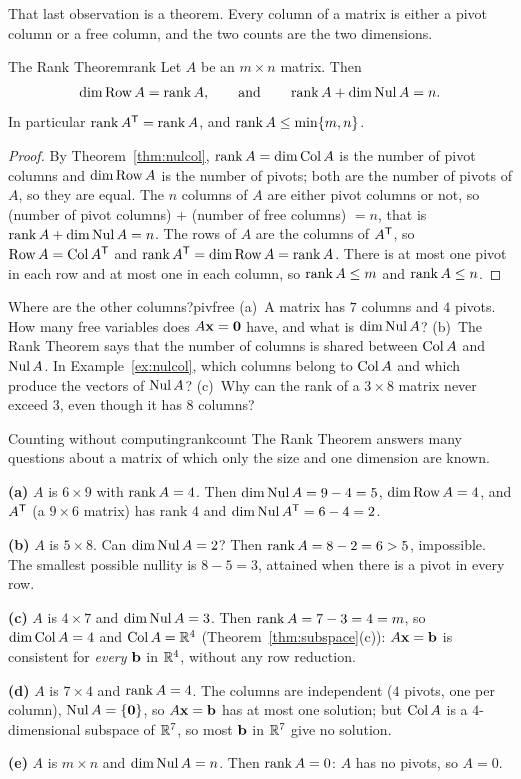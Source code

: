 \documentclass[11pt]{article}
\begin{document}
That last observation is a theorem. Every column of a matrix is either a pivot column or a free column, and the two counts are the two dimensions.

\begin{thm}{The Rank Theorem}{rank}
Let $A$ be an $m\times n$ matrix. Then
\[
\dim\operatorname{Row} A=\operatorname{rank} A,\qquad\text{and}\qquad \operatorname{rank} A+\dim\operatorname{Nul} A=n.
\]
In particular $\operatorname{rank} A^{\mathsf T}=\operatorname{rank} A$, and $\operatorname{rank} A\le\min\{m,n\}$.
\end{thm}

\begin{proof}
By Theorem~\ref{thm:nulcol}, $\operatorname{rank} A=\dim\operatorname{Col} A$ is the number of pivot columns and $\dim\operatorname{Row} A$ is the number of pivots; both are the number of pivots of $A$, so they are equal. The $n$ columns of $A$ are either pivot columns or not, so (number of pivot columns) $+$ (number of free columns) $=n$, that is $\operatorname{rank} A+\dim\operatorname{Nul} A=n$. The rows of $A$ are the columns of $A^{\mathsf T}$, so $\operatorname{Row} A=\operatorname{Col} A^{\mathsf T}$ and $\operatorname{rank} A^{\mathsf T}=\dim\operatorname{Row} A=\operatorname{rank} A$. There is at most one pivot in each row and at most one in each column, so $\operatorname{rank} A\le m$ and $\operatorname{rank} A\le n$.
\end{proof}

\begin{think}{Where are the other columns?}{pivfree}
(a)~A matrix has $7$ columns and $4$ pivots. How many free variables does $A\mathbf{x}=\mathbf{0}$ have, and what is $\dim\operatorname{Nul} A$? (b)~The Rank Theorem says that the number of columns is shared between $\operatorname{Col} A$ and $\operatorname{Nul} A$. In Example~\ref{ex:nulcol}, which columns belong to $\operatorname{Col} A$ and which produce the vectors of $\operatorname{Nul} A$? (c)~Why can the rank of a $3\times 8$ matrix never exceed $3$, even though it has $8$ columns?
\end{think}

\begin{exmp}{Counting without computing}{rankcount}
The Rank Theorem answers many questions about a matrix of which only the size and one dimension are known.

\textbf{(a)} $A$ is $6\times9$ with $\operatorname{rank} A=4$. Then $\dim\operatorname{Nul} A=9-4=5$, $\dim\operatorname{Row} A=4$, and $A^{\mathsf T}$ (a $9\times6$ matrix) has rank $4$ and $\dim\operatorname{Nul} A^{\mathsf T}=6-4=2$.

\textbf{(b)} $A$ is $5\times8$. Can $\dim\operatorname{Nul} A=2$? Then $\operatorname{rank} A=8-2=6>5$, impossible. The smallest possible nullity is $8-5=3$, attained when there is a pivot in every row.

\textbf{(c)} $A$ is $4\times7$ and $\dim\operatorname{Nul} A=3$. Then $\operatorname{rank} A=7-3=4=m$, so $\dim\operatorname{Col} A=4$ and $\operatorname{Col} A=\mathbb{R}^4$ (Theorem~\ref{thm:subspace}(c)): $A\mathbf{x}=\mathbf{b}$ is consistent for \emph{every} $\mathbf{b}$ in $\mathbb{R}^4$, without any row reduction.

\textbf{(d)} $A$ is $7\times4$ and $\operatorname{rank} A=4$. The columns are independent ($4$ pivots, one per column), $\operatorname{Nul} A=\{\mathbf{0}\}$, so $A\mathbf{x}=\mathbf{b}$ has at most one solution; but $\operatorname{Col} A$ is a $4$-dimensional subspace of $\mathbb{R}^7$, so most $\mathbf{b}$ in $\mathbb{R}^7$ give no solution.

\textbf{(e)} $A$ is $m\times n$ and $\dim\operatorname{Nul} A=n$. Then $\operatorname{rank} A=0$: $A$ has no pivots, so $A=0$.
\end{exmp}
\end{document}
